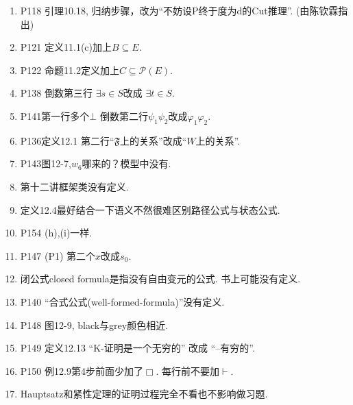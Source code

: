 \documentclass{article}
\begin{document}
\begin{enumerate}
\item P118 引理10.18, 归纳步骤，改为``不妨设P终于度为d的Cut推理''. (由陈钦霖指出)
\item P121 定义11.1(c)加上$B\subseteq E$. 
\item P122 命题11.2定义加上$C\subseteq \mathcal{P}(E)$. 
\item P138 倒数第三行 $\exists s \in S$改成 $\exists t \in S$. 
\item P141第一行多个$\bot$ 倒数第二行$\psi_1 \psi_2$改成$\varphi_1 \varphi_2$. 
\item P136定义12.1 第二行``$\mathfrak{F}$上的关系''改成``$W$上的关系''. 
\item P143图12-7,$w_6$哪来的？模型中没有. 
\item 第十二讲框架类没有定义. 


\item 定义12.4最好结合一下语义不然很难区别路径公式与状态公式. 
\item P154 (h),(i)一样. 
\item P147 (P1) 第二个$x$改成$s_0$. 
\item 闭公式closed formula是指没有自由变元的公式. 书上可能没有定义. 
\item P140 ``合式公式(well-formed-formula)''没有定义. 
\item P148 图12-9, black与grey颜色相近. 
\item P149 定义12.13 ``K-证明是一个无穷的'' 改成 ``--有穷的''. 
\item P150 例12.9第4步前面少加了$\Box$. 每行前不要加$\vdash$. 

\item Hauptsatz和紧性定理的证明过程完全不看也不影响做习题. 








\end{enumerate}
\end{document}
